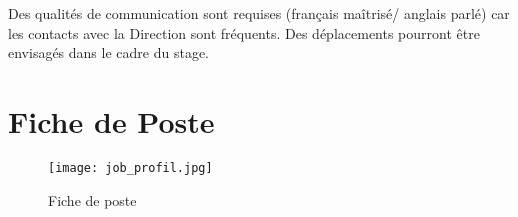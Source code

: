 Des qualités de communication sont requises (français maîtrisé/ anglais parlé) car les contacts avec la Direction sont fréquents. Des déplacements pourront être envisagés dans le cadre du stage. 


\section{Fiche de Poste}
 \begin{figure}[H]
    \centering
    \texttt{[image: job\_profil.jpg]}
	\caption{Fiche de poste}\label{image.jobprofil} 
\end{figure} 

\clearpage
